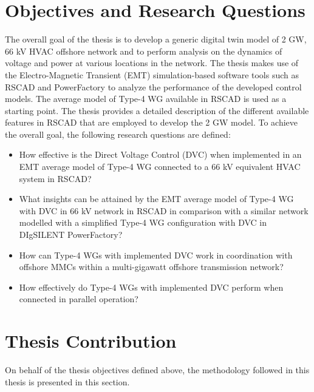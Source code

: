 \section{Objectives and Research Questions}
The overall goal of the thesis is to develop a generic digital twin model of 2 GW, 66 kV \gls{HVAC} offshore network and to perform analysis on the dynamics of voltage and power at various locations in the network. The thesis makes use of the Electro-Magnetic Transient (\gls{EMT}) simulation-based software tools such as RSCAD and PowerFactory to analyze the performance of the developed control models. The average model of Type-4 \gls{WG} available in RSCAD is used as a starting point. The thesis provides a detailed description of the different available features in RSCAD that are employed to develop the 2 GW model. 
To achieve the overall goal, the following research questions are defined:
\begin{itemize}
    \item How effective is the Direct Voltage Control (\gls{DVC}) when implemented in an \gls{EMT} average model of Type-4 \gls{WG} connected to a 66 kV equivalent \gls{HVAC} system in RSCAD?
    
    \item What insights can be attained by the \gls{EMT} average model of Type-4 \gls{WG} with \gls{DVC} in 66 kV network in RSCAD in comparison with a similar network modelled with a simplified Type-4 \gls{WG} configuration with \gls{DVC} in DIgSILENT PowerFactory?
    
    \item How can Type-4 \gls{WG}s with implemented \gls{DVC} work in coordination with offshore \gls{MMC}s within a multi-gigawatt offshore transmission network?
    
    \item How effectively do Type-4 \gls{WG}s with implemented \gls{DVC} perform when connected in parallel operation?

\end{itemize}

\section{Thesis Contribution}
On behalf of the thesis objectives defined above, the methodology followed in this thesis is presented in this section.

